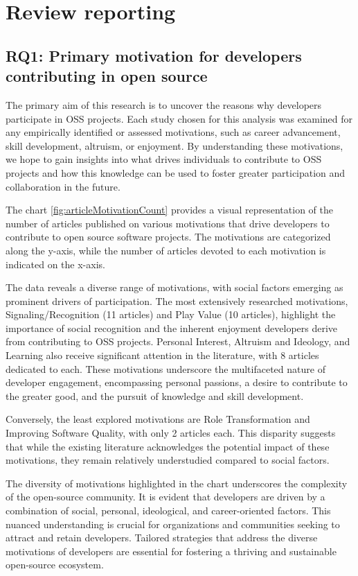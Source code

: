 \section{Review reporting}
\subsection{RQ1: Primary motivation for developers contributing in open source}

The primary aim of this research is to uncover the reasons why developers participate in OSS projects. Each study chosen for this analysis was examined for any empirically identified or assessed motivations, such as career advancement, skill development, altruism, or enjoyment. By understanding these motivations, we hope to gain insights into what drives individuals to contribute to OSS projects and how this knowledge can be used to foster greater participation and collaboration in the future.

The chart \ref{fig:articleMotivationCount} provides a visual representation of the number of articles published on various motivations that drive developers to contribute to open source software projects. The motivations are categorized along the y-axis, while the number of articles devoted to each motivation is indicated on the x-axis.

The data reveals a diverse range of motivations, with social factors emerging as prominent drivers of participation. The most extensively researched motivations, Signaling/Recognition (11 articles) and Play Value (10 articles), highlight the importance of social recognition and the inherent enjoyment developers derive from contributing to OSS projects. Personal Interest, Altruism and Ideology, and Learning also receive significant attention in the literature, with 8 articles dedicated to each. These motivations underscore the multifaceted nature of developer engagement, encompassing personal passions, a desire to contribute to the greater good, and the pursuit of knowledge and skill development.

Conversely, the least explored motivations are Role Transformation and Improving Software Quality, with only 2 articles each. This disparity suggests that while the existing literature acknowledges the potential impact of these motivations, they remain relatively understudied compared to social factors.

The diversity of motivations highlighted in the chart underscores the complexity of the open-source community. It is evident that developers are driven by a combination of social, personal, ideological, and career-oriented factors. This nuanced understanding is crucial for organizations and communities seeking to attract and retain developers. Tailored strategies that address the diverse motivations of developers are essential for fostering a thriving and sustainable open-source ecosystem.

